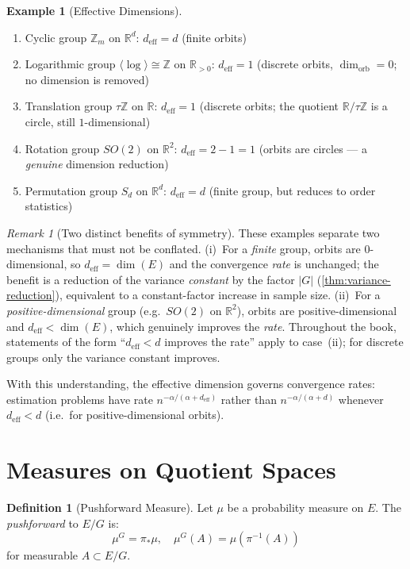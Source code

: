 \documentclass[11pt,twoside,openright]{book}
\theoremstyle{plain}
\theoremstyle{definition}
\newtheorem{definition}[theorem]{Definition}
\newtheorem{example}[theorem]{Example}
\theoremstyle{remark}
\newtheorem{remark}[theorem]{Remark}
\newcommand{\Rd}{\mathbb{R}}
\newcommand{\Zd}{\mathbb{Z}}
\newcommand{\deff}{d_{\mathrm{eff}}}
\begin{document}
\begin{example}[Effective Dimensions]
\begin{enumerate}
\item Cyclic group $\Zd_m$ on $\Rd^d$: $\deff = d$ (finite orbits)
\item Logarithmic group $\langle\log\rangle\cong\Zd$ on $\Rd_{>0}$: $\deff = 1$ (discrete orbits, $\dim_{\text{orb}}=0$; no dimension is removed)
\item Translation group $\tau\Zd$ on $\Rd$: $\deff = 1$ (discrete orbits; the quotient $\Rd/\tau\Zd$ is a circle, still $1$-dimensional)
\item Rotation group $SO(2)$ on $\Rd^2$: $\deff = 2-1 = 1$ (orbits are circles --- a \emph{genuine} dimension reduction)
\item Permutation group $S_d$ on $\Rd^d$: $\deff = d$ (finite group, but reduces to order statistics)
\end{enumerate}
\end{example}

\begin{remark}[Two distinct benefits of symmetry]
\label{rem:two-benefits}
These examples separate two mechanisms that must not be conflated. (i)~For a \emph{finite} group, orbits are $0$-dimensional, so $\deff=\dim(E)$ and the convergence \emph{rate} is unchanged; the benefit is a reduction of the variance \emph{constant} by the factor $|G|$ (\cref{thm:variance-reduction}), equivalent to a constant-factor increase in sample size. (ii)~For a \emph{positive-dimensional} group (e.g.\ $SO(2)$ on $\Rd^2$), orbits are positive-dimensional and $\deff<\dim(E)$, which genuinely improves the \emph{rate}. Throughout the book, statements of the form ``$\deff<d$ improves the rate'' apply to case~(ii); for discrete groups only the variance constant improves.
\end{remark}

With this understanding, the effective dimension governs convergence rates: estimation problems have rate $n^{-\alpha/(\alpha + \deff)}$ rather than $n^{-\alpha/(\alpha + d)}$ whenever $\deff<d$ (i.e.\ for positive-dimensional orbits).

\section{Measures on Quotient Spaces}

\begin{definition}[Pushforward Measure]
Let $\mu$ be a probability measure on $E$. The \emph{pushforward} to $E/G$ is:
\[
\mu^G = \pi_* \mu, \quad \mu^G(A) = \mu(\pi^{-1}(A))
\]
for measurable $A \subset E/G$.
\end{definition}
\end{document}
